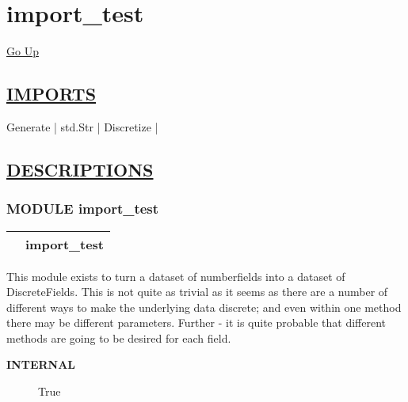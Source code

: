 \chapter*{\color{headfile}
import_test
}
\hypertarget{ecldoc:toc:import_test}{}
\hyperlink{ecldoc:toc:root}{Go Up}

\section*{\underline{\textsf{IMPORTS}}}
\begin{doublespace}
{\large
Generate |
std.Str |
Discretize |
}
\end{doublespace}

\section*{\underline{\textsf{DESCRIPTIONS}}}
\subsection*{\textsf{\colorbox{headtoc}{\color{white} MODULE}
import\_test}}

\hypertarget{ecldoc:Discretize}{}

{\renewcommand{\arraystretch}{1.5}
\begin{tabularx}{\textwidth}{|>{\raggedright\arraybackslash}l|X|}
\hline
\hspace{0pt}\mytexttt{\color{red} } & \textbf{import\_test} \\
\hline
\end{tabularx}
}

\par





This module exists to turn a dataset of numberfields into a dataset of DiscreteFields. This is not quite as trivial as it seems as there are a number of different ways to make the underlying data discrete; and even within one method there may be different parameters. Further - it is quite probable that different methods are going to be desired for each field.










\par
\begin{description}
\item [\colorbox{tagtype}{\color{white} \textbf{\textsf{INTERNAL}}}] True
\end{description}



